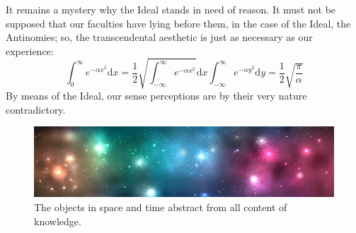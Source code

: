 \documentclass[twoside]{hrothgar-article}
\begin{document}
It remains a
mystery why the Ideal stands in need of reason. It must not be
supposed that our faculties have lying before them, in the case of the
Ideal, the Antinomies; so, the transcendental aesthetic is just as
necessary as our experience:
\[ \int_0^\infty e^{-\alpha x^2} \mathrm{d}x =
            \frac12\sqrt{\int_{-\infty}^\infty e^{-\alpha x^2}}
            \mathrm{d}x\int_{-\infty}^\infty e^{-\alpha y^2}\mathrm{d}y =
            \frac12\sqrt{\frac{\pi}{\alpha}} \]
By means of the Ideal, our sense
perceptions are by their very nature contradictory.

\begin{figure}[h]
	\begin{whole}
		\includegraphics[width=\wholewidth]{space.png}
		\caption[Space]{
		The objects in space and time abstract from all content of knowledge.
		}
		\label{figure:space}
	\end{whole}
\end{figure}
\end{document}
